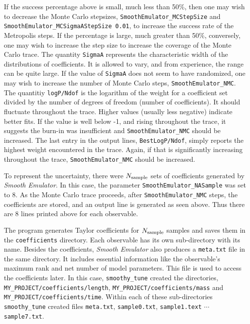 \documentclass[UserManual.tex]{subfiles}
\begin{document}
If the success percentage above is small, much less than 50\%, then one may wish to decrease the Monte Carlo stepsizes, {\tt SmoothEmulator\_MCStepSize} and {\tt SmoothEmulator\_MCSigmaAStepSize 0.01}, to increase the success rate of the Metropolis steps. If the percentage is large, much greater than 50\%, conversely, one may wish to increase the step size to increase the coverage of the Monte Carlo trace. The quantity {\tt SigmaA} represents the characteristic width of the distributions of coefficients. It is allowed to vary, and from experience, the range can be quite large. If the value of {\tt SigmaA} does not seem to have randomized, one may wish to increase the number of Monte Carlo steps, {\tt  SmoothEmulator\_NMC}. The quantitiy {\tt logP/Ndof} is the logarithm of the weight for a coefficient set divided by the number of degrees of freedom (number of coefficients). It should fluctuate throughout the trace. Higher values (usually less negative) indicate better fits. If the value is well below -1, and rising throughout the trace, it suggests the burn-in was insufficient and {\tt  SmoothEmulator\_NMC} should be increased. The last entry in the output lines, {\tt BestLogP/Ndof}, simply reports the highest weight encountered in the trace. Again, if that is significantly increasing throughout the trace, {\tt  SmoothEmulator\_NMC} should be increased. 

To represent the uncertainty, there were $N_{\rm sample}$ sets of coefficients generated by {\it Smooth Emulator}. In this case, the parameter {\tt SmoothEmulator\_NASample} was set to 8. As the Monte Carlo trace proceeds, after {\tt SmoothEmulator\_NMC} steps, the coefficients are stored, and an output line is generated as seen above. Thus there are 8 lines printed above for each observable.

The program generates Taylor coefficients for $N_{\rm sample}$ samples and saves them in the {\tt coefficients} directory. Each observable has its own sub-directory with its name. Besides the coefficients, {\it Smooth Emulator} also produces a {\tt meta.txt} file in the same directory. It includes essential information like the observable's maximum rank and net number of model parameters. This file is used to access the coefficients later. In this case, {\tt smoothy\_tune} created the directories, {\tt MY\_PROJECT/coefficients/length},  {\tt MY\_PROJECT/coefficients/mass} and {\tt MY\_PROJECT/coefficients/time}. Within each of these sub-directories {\tt smoothy\_tune} created files {\tt meta.txt}, {\tt sample0.txt}, {\tt sample1.text} $\cdots$ {\tt sample7.txt}.
\end{document}
